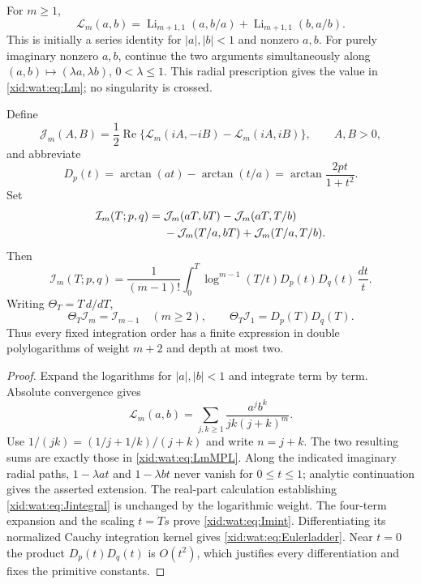 \begin{theorem}
\label{xid:wat:thm:ladder}
For $m\geq1$,
\begin{equation}\label{xid:wat:eq:LmMPL}
 \mathcal L_m(a,b)
 =\operatorname{Li}_{m+1,1}(a,b/a)
  +\operatorname{Li}_{m+1,1}(b,a/b).
\end{equation}
This is initially a series identity for $|a|,|b|<1$ and nonzero $a,b$.
For purely imaginary nonzero $a,b$, continue the two arguments
simultaneously along $(a,b)\mapsto(\lambda a,\lambda b)$,
$0<\lambda\leq1$. This radial prescription gives the value in
\eqref{xid:wat:eq:Lm}; no singularity is crossed.

Define
\[
 \mathcal J_m(A,B)=\frac12\operatorname{Re}
     \{\mathcal L_m(iA,-iB)-\mathcal L_m(iA,iB)\},
 \qquad A,B>0,
\]
and abbreviate
\[
 D_p(t)=\arctan(at)-\arctan(t/a)
       =\arctan\frac{2pt}{1+t^2}.
\]
Set
\begin{align}\label{xid:wat:eq:Imclosed}
 \mathcal I_m(T;p,q)
 ={}&\mathcal J_m(aT,bT)-\mathcal J_m(aT,T/b)\notag\\
   &-\mathcal J_m(T/a,bT)+\mathcal J_m(T/a,T/b).
\end{align}
Then
\begin{equation}\label{xid:wat:eq:Imint}
 \mathcal I_m(T;p,q)
 =\frac1{(m-1)!}\int_0^T
    \log^{m-1}(T/t)D_p(t)D_q(t)\,\frac{dt}{t}.
\end{equation}
Writing $\Theta_T=T\,d/dT$,
\begin{equation}\label{xid:wat:eq:Eulerladder}
 \Theta_T\mathcal I_m=\mathcal I_{m-1}\quad(m\geq2),
 \qquad
 \Theta_T\mathcal I_1=D_p(T)D_q(T).
\end{equation}
Thus every fixed integration order has a finite expression in double
polylogarithms of weight $m+2$ and depth at most two.
\end{theorem}

\begin{proof}
Expand the logarithms for $|a|,|b|<1$ and integrate term by term.
Absolute convergence gives
\[
 \mathcal L_m(a,b)
 =\sum_{j,k\geq1}\frac{a^jb^k}{jk(j+k)^m}.
\]
Use $1/(jk)=(1/j+1/k)/(j+k)$ and write $n=j+k$.
The two resulting sums are exactly those in
\eqref{xid:wat:eq:LmMPL}. Along the indicated imaginary radial paths,
$1-\lambda at$ and $1-\lambda bt$ never vanish for $0\leq t\leq1$;
analytic continuation gives the asserted extension. The real-part
calculation establishing \eqref{xid:wat:eq:Jintegral} is unchanged by
the logarithmic weight. The four-term expansion and the scaling
$t=Ts$ prove \eqref{xid:wat:eq:Imint}. Differentiating its normalized
Cauchy integration kernel gives \eqref{xid:wat:eq:Eulerladder}.
Near $t=0$ the product $D_p(t)D_q(t)$ is $O(t^2)$, which
justifies every differentiation and fixes the primitive constants.
\end{proof}

